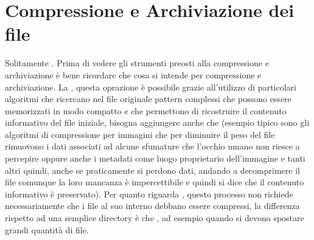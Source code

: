\section{Compressione e Archiviazione dei file}
\label{sec:Compressione-e-Archiviazione-dei-file}
Solitamente . Prima di vedere gli strumenti preosti alla compressione e archiviazione è bene ricordare che cosa si intende per compressione e archiviazione. La , questa oprazione è possibile grazie all'utilizzo di particolari algoritmi che ricercano nel file originale pattern complessi che possono essere memorizzati in modo compatto e che permettono di ricostruire il contenuto informativo del file iniziale, bisogna aggiungere anche che  (esempio tipico sono gli algoritmi di compressione per immagini che per diminuire il peso del file rimuovono i dati associati ad alcune sfumature che l'occhio umano non riesce a percepire oppure anche i metadati come luogo proprietario dell'immagine e tanti altri quindi, anche se praticamente si perdono dati, andando a decomprimere il file comunque la loro mancanza è impercettibile e quindi si dice che il contenuto informativo è preservato). Per quanto riguarda , questo processo non richiede necessariamente che i file al suo interno debbano essere compressi, la differenza rispetto ad una semplice directory è che , ad esempio quando si devono spostare grandi quantità di file.  

